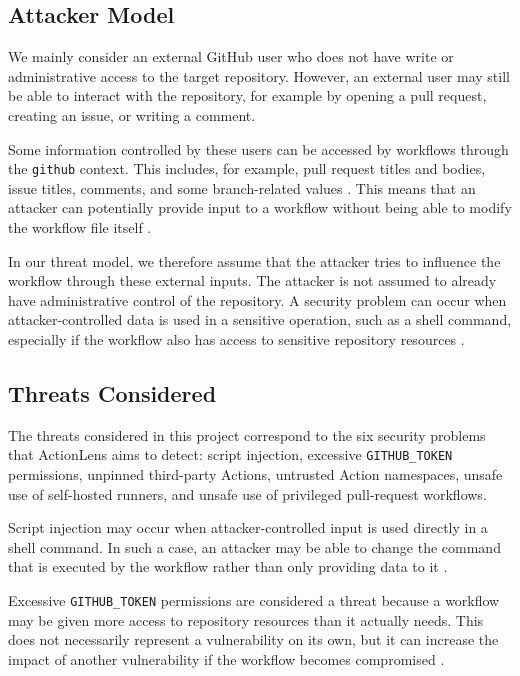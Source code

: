 \documentclass{article}
\begin{document}
\subsection{Attacker Model}

We mainly consider an external GitHub user who does not have write or administrative access to the target repository. However, an external user may still be able to interact with the repository, for example by opening a pull request, creating an issue, or writing a comment.

Some information controlled by these users can be accessed by workflows through the \texttt{github} context. This includes, for example, pull request titles and bodies, issue titles, comments, and some branch-related values \cite{githubcontexts,githubscriptinjection}. This means that an attacker can potentially provide input to a workflow without being able to modify the workflow file itself \cite{githubscriptinjection}.

In our threat model, we therefore assume that the attacker tries to influence the workflow through these external inputs. The attacker is not assumed to already have administrative control of the repository. A security problem can occur when attacker-controlled data is used in a sensitive operation, such as a shell command, especially if the workflow also has access to sensitive repository resources \cite{githubscriptinjection,githubsecurity}.

\subsection{Threats Considered}

The threats considered in this project correspond to the six security problems that ActionLens aims to detect: script injection, excessive \texttt{GITHUB\_TOKEN} permissions, unpinned third-party Actions, untrusted Action namespaces, unsafe use of self-hosted runners, and unsafe use of privileged pull-request workflows. 

Script injection may occur when attacker-controlled input is used directly in a shell command. In such a case, an attacker may be able to change the command that is executed by the workflow rather than only providing data to it \cite{githubscriptinjection}. %

Excessive \texttt{GITHUB\_TOKEN} permissions are considered a threat because a workflow may be given more access to repository resources than it actually needs. This does not necessarily represent a vulnerability on its own, but it can increase the impact of another vulnerability if the workflow becomes compromised \cite{githubtoken,githubsecurity}.
\end{document}

